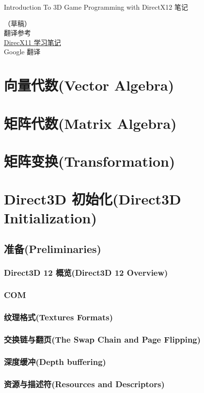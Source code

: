 \documentclass[11pt,a4paper,oldfontcommands]{memoir}
\begin{document}
\thispagestyle{empty}
{
\sffamily
\centering
{\LARGE
Introduction To 3D Game Programming with DirectX12 笔记
}

\vspace{3.5cm}
（草稿）\\
翻译参考\\
\href{http://shiba.hpe.sh.cn/jiaoyanzu/WULI/Soft/NotXNA}{\textcolor{linkColor}{DirecX11 学习笔记}}\\
Google 翻译
\clearpage
\tableofcontents*
\clearpage
\chapter{向量代数(Vector Algebra)}
\chapter{矩阵代数(Matrix Algebra)}
\chapter{矩阵变换(Transformation)}
\chapter{Direct3D 初始化(Direct3D Initialization)}
\section{准备(Preliminaries)}
\subsection{Direct3D 12 概览(Direct3D 12 Overview)}
\subsection{COM}
\subsection{纹理格式(Textures Formats)}
\subsection{交换链与翻页(The Swap Chain and Page Flipping)}
\subsection{深度缓冲(Depth buffering)}
\subsection{资源与描述符(Resources and Descriptors)}
}
\end{document}
